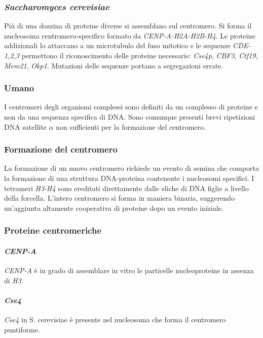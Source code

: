 		\subsubsection{\emph{Saccharomyces cerevisiae}}
		Pi\`u di una dozzina di proteine diverse si assemblano sul centromero.
		Si forma il nucleosoma centromero-specifico formato da \emph{CENP-A-H2A-H2B-H4}.
		Le proteine addizionali lo attaccano a un microtubulo del fuso mitotico e le sequenze \emph{CDE-1,2,3} permettono il riconoscimento delle proteine necessarie: \emph{Cse4p}, \emph{CBF3}, \emph{Ctf19}, \emph{Mem21}, \emph{Okp1}.
		Mutazioni delle sequenze portano a segregazioni errate.

		\subsubsection{Umano}
		I centromeri degli organismi complessi sono definiti da un complesso di proteine e non da una sequenza specifica di DNA.
		Sono comunque presenti brevi ripetizioni DNA satellite $\alpha$ non sufficienti per la formazione del centromero.

		\subsubsection{Formazione del centromero}
		La formazione di un nuovo centromero richiede un evento di semina che comporta la formazione di una struttura DNA-proteina contenente i nucleosomi specifici.
		I tetrameri \emph{H3-H4} sono ereditati direttamente dalle eliche di DNA figlie a livello della forcella.
		L'intero centromero si forma in maniera binaria, suggerendo un'aggiunta altamente cooperativa di proteine dopo un evento iniziale.

		\subsubsection{Proteine centromeriche}

			\paragraph{\emph{CENP-A}}
			\emph{CENP-A} \`e in grado di assemblare in vitro le particelle nucleoproteine in assenza di \emph{H3}.

			\paragraph{\emph{Cse4}}
			\emph{Cse4} in S. cerevisiae \`e presente nel nucleosoma che forma il centromero puntiforme.

